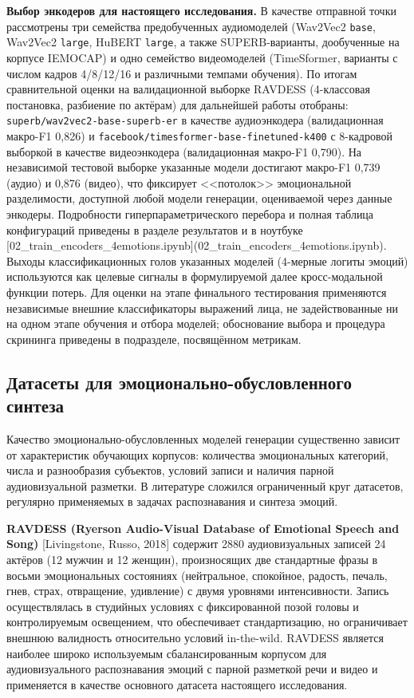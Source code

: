 \documentclass[a4paper, 12pt, oneside, openany]{article}
\begin{document}
\textbf{Выбор энкодеров для настоящего исследования.} В качестве отправной точки рассмотрены три семейства предобученных аудиомоделей (Wav2Vec2 \texttt{base}, Wav2Vec2 \texttt{large}, HuBERT \texttt{large}, а также SUPERB-варианты, дообученные на корпусе IEMOCAP) и одно семейство видеомоделей (TimeSformer, варианты с числом кадров 4/8/12/16 и различными темпами обучения). По итогам сравнительной оценки на валидационной выборке RAVDESS (4-классовая постановка, разбиение по актёрам) для дальнейшей работы отобраны: \texttt{superb/wav2vec2-base-superb-er} в качестве аудиоэнкодера (валидационная макро-F1 0,826) и \texttt{facebook/timesformer-base-finetuned-k400} с 8-кадровой выборкой в качестве видеоэнкодера (валидационная макро-F1 0,790). На независимой тестовой выборке указанные модели достигают макро-F1 0,739 (аудио) и 0,876 (видео), что фиксирует <<потолок>> эмоциональной разделимости, доступной любой модели генерации, оцениваемой через данные энкодеры. Подробности гиперпараметрического перебора и полная таблица конфигураций приведены в разделе результатов и в ноутбуке [02\_train\_encoders\_4emotions.ipynb](02\_train\_encoders\_4emotions.ipynb). Выходы классификационных голов указанных моделей (4-мерные логиты эмоций) используются как целевые сигналы в формулируемой далее кросс-модальной функции потерь. Для оценки на этапе финального тестирования применяются независимые внешние классификаторы выражений лица, не задействованные ни на одном этапе обучения и отбора моделей; обоснование выбора и процедура скрининга приведены в подразделе, посвящённом метрикам.

\subsection{Датасеты для эмоционально-обусловленного синтеза}

Качество эмоционально-обусловленных моделей генерации существенно зависит от характеристик обучающих корпусов: количества эмоциональных категорий, числа и разнообразия субъектов, условий записи и наличия парной аудиовизуальной разметки. В литературе сложился ограниченный круг датасетов, регулярно применяемых в задачах распознавания и синтеза эмоций.

\textbf{RAVDESS (Ryerson Audio-Visual Database of Emotional Speech and Song)} [Livingstone, Russo, 2018] содержит 2880 аудиовизуальных записей 24 актёров (12 мужчин и 12 женщин), произносящих две стандартные фразы в восьми эмоциональных состояниях (нейтральное, спокойное, радость, печаль, гнев, страх, отвращение, удивление) с двумя уровнями интенсивности. Запись осуществлялась в студийных условиях с фиксированной позой головы и контролируемым освещением, что обеспечивает стандартизацию, но ограничивает внешнюю валидность относительно условий in-the-wild. RAVDESS является наиболее широко используемым сбалансированным корпусом для аудиовизуального распознавания эмоций с парной разметкой речи и видео и применяется в качестве основного датасета настоящего исследования.
\end{document}
